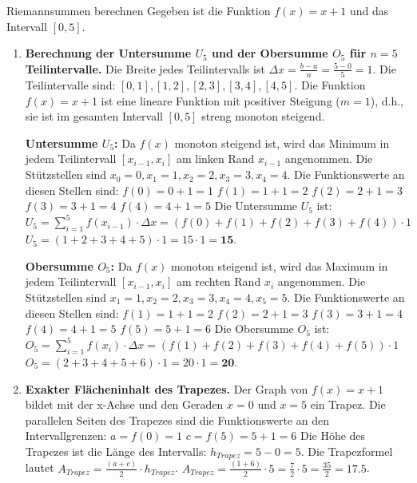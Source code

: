 \begin{loesungsumgebung}{Riemannsummen berechnen}
Gegeben ist die Funktion $f(x) = x+1$ und das Intervall $[0,5]$.

\begin{enumerate}[label=(\alph*)]
    \item \textbf{Berechnung der Untersumme $U_5$ und der Obersumme $O_5$ für $n=5$ Teilintervalle.}
    Die Breite jedes Teilintervalls ist $\Delta x = \frac{b-a}{n} = \frac{5-0}{5} = 1$.
    Die Teilintervalle sind: $[0,1], [1,2], [2,3], [3,4], [4,5]$.
    Die Funktion $f(x)=x+1$ ist eine lineare Funktion mit positiver Steigung ($m=1$), d.h., sie ist im gesamten Intervall $[0,5]$ streng monoton steigend.

    \textbf{Untersumme $U_5$:}
    Da $f(x)$ monoton steigend ist, wird das Minimum in jedem Teilintervall $[x_{i-1}, x_i]$ am linken Rand $x_{i-1}$ angenommen. Die Stützstellen sind $x_0=0, x_1=1, x_2=2, x_3=3, x_4=4$.
    Die Funktionswerte an diesen Stellen sind:
    $f(0) = 0+1 = 1$
    $f(1) = 1+1 = 2$
    $f(2) = 2+1 = 3$
    $f(3) = 3+1 = 4$
    $f(4) = 4+1 = 5$
    Die Untersumme $U_5$ ist:
    $U_5 = \sum_{i=1}^{5} f(x_{i-1}) \cdot \Delta x = (f(0) + f(1) + f(2) + f(3) + f(4)) \cdot 1$
    $U_5 = (1 + 2 + 3 + 4 + 5) \cdot 1 = 15 \cdot 1 = \mathbf{15}$.

    \textbf{Obersumme $O_5$:}
    Da $f(x)$ monoton steigend ist, wird das Maximum in jedem Teilintervall $[x_{i-1}, x_i]$ am rechten Rand $x_i$ angenommen. Die Stützstellen sind $x_1=1, x_2=2, x_3=3, x_4=4, x_5=5$.
    Die Funktionswerte an diesen Stellen sind:
    $f(1) = 1+1 = 2$
    $f(2) = 2+1 = 3$
    $f(3) = 3+1 = 4$
    $f(4) = 4+1 = 5$
    $f(5) = 5+1 = 6$
    Die Obersumme $O_5$ ist:
    $O_5 = \sum_{i=1}^{5} f(x_i) \cdot \Delta x = (f(1) + f(2) + f(3) + f(4) + f(5)) \cdot 1$
    $O_5 = (2 + 3 + 4 + 5 + 6) \cdot 1 = 20 \cdot 1 = \mathbf{20}$.

    \item \textbf{Exakter Flächeninhalt des Trapezes.}
    Der Graph von $f(x)=x+1$ bildet mit der x-Achse und den Geraden $x=0$ und $x=5$ ein Trapez.
    Die parallelen Seiten des Trapezes sind die Funktionswerte an den Intervallgrenzen:
    $a = f(0) = 1$
    $c = f(5) = 5+1 = 6$
    Die Höhe des Trapezes ist die Länge des Intervalls: $h_{Trapez} = 5-0 = 5$.
    Die Trapezformel lautet $A_{Trapez} = \frac{(a+c)}{2} \cdot h_{Trapez}$.
    $A_{Trapez} = \frac{(1+6)}{2} \cdot 5 = \frac{7}{2} \cdot 5 = \frac{35}{2} = \mathbf{17.5}$.


\end{enumerate}
\end{loesungsumgebung}
